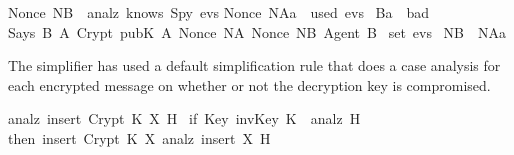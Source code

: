 \begin{isabellebody}
\begin{isamarkuptxt}
\begin{isabelle}
Nonce\ NB\ {}\ analz\ {}knows\ Spy\ evs{}{}{}\isanewline
{}Nonce\ NAa\ {}\ used\ evs{}{}\isanewline
{}\ Ba\ {}\ bad\ {}\isanewline
{}Says\ B\ A\ {}Crypt\ {}pubK\ A{}\ {}Nonce\ NA{}\ Nonce\ NB{}\ Agent\ B{}{}\isanewline
{}\ set\ evs{}\ {}\isanewline
{}NB\ {}\ NAa%
\end{isabelle}
The simplifier has used a 
default simplification rule that does a case
analysis for each encrypted message on whether or not the decryption key
is compromised.
\begin{isabelle}%
analz\ {}insert\ {}Crypt\ K\ X{}\ H{}\ {}\isanewline
{}if\ Key\ {}invKey\ K{}\ {}\ analz\ H\isanewline
{}then\ insert\ {}Crypt\ K\ X{}\ {}analz\ {}insert\ X\ H{}{}\isanewline

\end{isabelle}
\end{isamarkuptxt}
\end{isabellebody}
